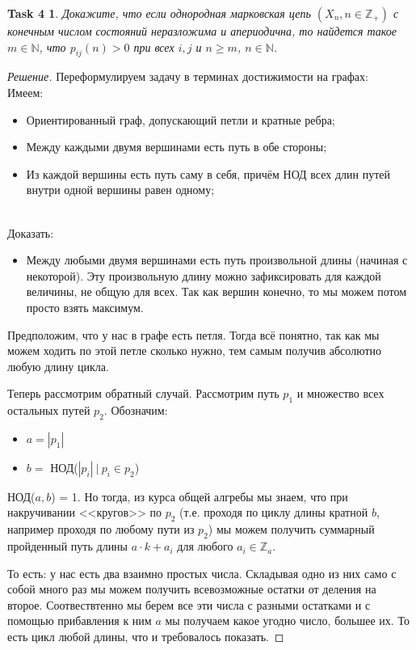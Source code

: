\documentclass[12pt,a4paper]{extarticle}
\newtheorem*{task4}{Task 4}
\newcommand{\Z}{\mathbb{Z}}
\newcommand{\N}{\mathbb{N}}
\begin{document}
	
	\begin{task4}
		Докажите, что если однородная марковская цепь $(X_n, n \in \Z_+)$ с конечным числом состояний неразложима и апериодична, то найдется такое $m \in \N$, что $p_{ij}(n) > 0$ при всех $i, j$ и $n \geq m$, $n \in \N$.
	\end{task4}
	\begin{proof}[Решение]
		Переформулируем задачу в терминах достижимости на графах:
		\vspace{\baselineskip}
		\\
		{\Large Имеем:}
		\begin{itemize}
			\item Ориентированный граф, допускающий петли и кратные ребра; 
			\item Между каждыми двумя вершинами есть путь в обе стороны;
			\item Из каждой вершины есть путь саму в себя, причём НОД всех длин путей внутри одной вершины равен одному;
		\end{itemize}
		\
		\\
		{\Large Доказать:}
		\begin{itemize}
			\item Между любыми двумя вершинами есть путь произвольной длины (начиная с некоторой). Эту произвольную длину можно зафиксировать для каждой величины, не общую для всех. Так как вершин конечно, то мы можем потом просто взять максимум.
		\end{itemize}
	
		\vspace{\baselineskip}
		
		Предположим, что у нас в графе есть петля. Тогда всё понятно, так как мы можем ходить по этой петле сколько нужно, тем самым получив абсолютно любую длину цикла. 
		
		Теперь рассмотрим обратный случай. Рассмотрим путь $p_1$ и множество всех остальных путей $p_2$. Обозначим:
		\begin{itemize}
			\item $a = |p_1|$
			\item $b = $ НОД($|p_i| ~|~ p_i \in p_2$)
		\end{itemize}
		НОД($a, b$) = 1. Но тогда, из курса общей алгребы мы знаем, что при накручивании <<кругов>> по $p_2$ (т.е. проходя по циклу длины кратной $b$, например проходя по любому пути из $p_2$) мы можем получить суммарный пройденный путь длины $a \cdot k + a_i$ для любого $a_i \in \Z_a$. 
		
		То есть: у нас есть два взаимно простых числа. Складывая одно из них само с собой много раз мы можем получить всевозможные остатки от деления на второе. Соотвествтенно мы берем все эти числа с разными остатками и с помощью прибавления к ним $a$ мы получаем какое угодно число, большее их. То есть цикл любой длины, что и требовалось показать.
		
	\end{proof}
	
\end{document}
